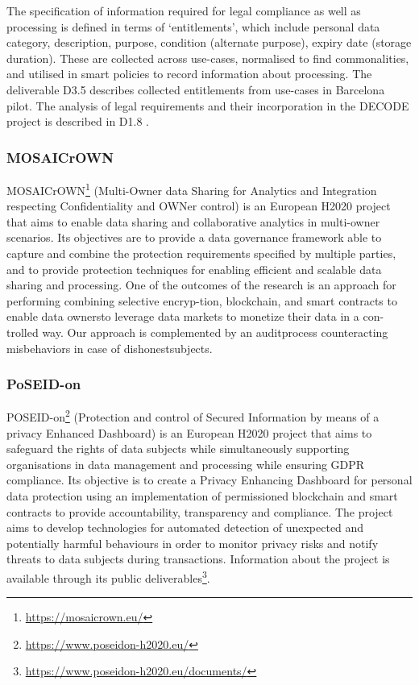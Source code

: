 The specification of information required for legal compliance as well as processing is defined in terms of `entitlements', which include personal data category, description, purpose, condition (alternate purpose), expiry date (storage duration). These are collected across use-cases, normalised to find commonalities, and utilised in smart policies to record information about processing. The deliverable D3.5 \cite{noauthor_decode_d3.5_initial_nodate} describes collected entitlements from use-cases in Barcelona pilot.
The analysis of legal requirements and their incorporation in the DECODE project is described in D1.8 \cite{noauthor_d1.8_legalframefordigcomm.pdf_nodate}.
\subsubsection{MOSAICrOWN}
MOSAICrOWN\footnote{\url{https://mosaicrown.eu/}} (Multi-Owner data Sharing for Analytics and Integration respecting Confidentiality and OWNer control) is an European H2020 project that aims to enable data sharing and collaborative analytics in multi-owner scenarios. Its objectives are to provide a data governance framework able to capture and combine the protection requirements specified by multiple parties, and to provide protection techniques for enabling efficient and scalable data sharing and processing.
One of the outcomes of the research is an approach for performing combining selective encryp-tion, blockchain, and smart contracts to enable data ownersto leverage data markets to monetize their data in a con-trolled way. Our approach is complemented by an auditprocess counteracting misbehaviors in case of dishonestsubjects.

\subsubsection{PoSEID-on}
POSEID-on\footnote{\url{https://www.poseidon-h2020.eu/}} (Protection and control of Secured Information by means of a privacy Enhanced Dashboard) is an European H2020 project that aims to safeguard the rights of data subjects
while simultaneously supporting organisations in data management and processing while ensuring GDPR compliance.
Its objective is to create a Privacy Enhancing Dashboard for personal data protection using an implementation of permissioned blockchain and smart contracts to provide accountability, transparency and compliance.
The project aims to develop technologies for automated detection of unexpected and potentially harmful behaviours in order to monitor privacy risks and notify threats to data subjects during transactions.
Information about the project is available through its public deliverables\footnote{\url{https://www.poseidon-h2020.eu/documents/}}.

